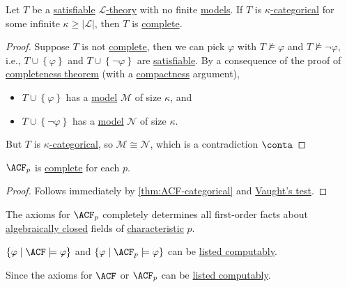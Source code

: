 \begin{theorem}\label{thm:Vaught-test}
	Let \(T\) be a \hyperref[def:satisfiable]{satisfiable} \hyperref[def:theory]{\(\mathcal{L} \)-theory} with no finite \hyperref[def:model]{models}. If \(T\) is \hyperref[def:categorical]{\(\kappa \)-categorical} for some infinite \(\kappa \geq \vert \mathcal{L}  \vert \), then \(T\) is \hyperref[def:theory-complete]{complete}.
\end{theorem}
\begin{proof}
	Suppose \(T\) is not \hyperref[def:theory-complete]{complete}, then we can pick \(\varphi \) with \(T \not \models \varphi \) and \(T \not \models \lnot \varphi \), i.e., \(T \cup \left\{ \varphi  \right\} \) and \(T \cup \left\{ \lnot \varphi  \right\} \) are \hyperref[def:satisfiable]{satisfiable}. By a consequence of the proof of \hyperref[thm:completeness]{completeness theorem} (with a \hyperref[thm:compactness]{compactness} argument),
	\begin{itemize}
		\item \(T \cup \left\{ \varphi  \right\} \) has a \hyperref[def:model]{model} \(\mathcal{M} \) of size \(\kappa \), and
		\item \(T \cup \left\{ \lnot \varphi  \right\} \) has a \hyperref[def:model]{model} \(\mathcal{N} \) of size \(\kappa \).
	\end{itemize}
	But \(T\) is \hyperref[def:categorical]{\(\kappa \)-categorical}, so \(\mathcal{M} \cong \mathcal{N} \), which is a contradiction \(\conta\)
\end{proof}

\begin{corollary}\label{col:ACF-p-complete}
	\(\ACF_p\) is \hyperref[def:theory-complete]{complete} for each \(p\).
\end{corollary}
\begin{proof}
	Follows immediately by \autoref{thm:ACF-categorical} and \hyperref[thm:Vaught-test]{Vaught's test}.
\end{proof}

The axioms for \(\ACF_p \) completely determines all first-order facts about \hyperref[def:algebraically-closed]{algebraically closed} fields of \hyperref[def:characteristic]{characteristic} \(p\).

\begin{remark}
	\(\left\{ \varphi \mid \ACF \models \varphi \right\} \) and \(\left\{ \varphi \mid \ACF_p \models \varphi \right\} \) can be \hyperref[def:computably-enumerable]{listed computably}.
\end{remark}
\begin{explanation}
	Since the axioms for \(\ACF \) or \(\ACF_p \) can be \hyperref[def:computably-enumerable]{listed computably}.
\end{explanation}

